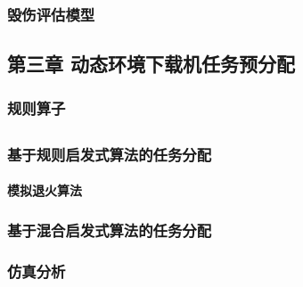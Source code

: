 \hypertarget{ux6bc1ux4f24ux8bc4ux4f30ux6a21ux578b}{%
\subsubsection{毁伤评估模型}\label{ux6bc1ux4f24ux8bc4ux4f30ux6a21ux578b}}

\hypertarget{ux7b2cux4e09ux7ae0-ux52a8ux6001ux73afux5883ux4e0bux8f7dux673aux4efbux52a1ux9884ux5206ux914d}{%
\subsection{第三章
动态环境下载机任务预分配}\label{ux7b2cux4e09ux7ae0-ux52a8ux6001ux73afux5883ux4e0bux8f7dux673aux4efbux52a1ux9884ux5206ux914d}}

\hypertarget{ux89c4ux5219ux7b97ux5b50}{%
\subsubsection{规则算子}\label{ux89c4ux5219ux7b97ux5b50}}

\hypertarget{section}{%
\subsection{}\label{section}}

\hypertarget{ux57faux4e8eux89c4ux5219ux542fux53d1ux5f0fux7b97ux6cd5ux7684ux4efbux52a1ux5206ux914d}{%
\subsubsection{基于规则启发式算法的任务分配}\label{ux57faux4e8eux89c4ux5219ux542fux53d1ux5f0fux7b97ux6cd5ux7684ux4efbux52a1ux5206ux914d}}

\hypertarget{ux6a21ux62dfux9000ux706bux7b97ux6cd5}{%
\paragraph{模拟退火算法}\label{ux6a21ux62dfux9000ux706bux7b97ux6cd5}}

\hypertarget{ux57faux4e8eux6df7ux5408ux542fux53d1ux5f0fux7b97ux6cd5ux7684ux4efbux52a1ux5206ux914d}{%
\subsubsection{基于混合启发式算法的任务分配}\label{ux57faux4e8eux6df7ux5408ux542fux53d1ux5f0fux7b97ux6cd5ux7684ux4efbux52a1ux5206ux914d}}

\hypertarget{ux4effux771fux5206ux6790}{%
\subsubsection{仿真分析}\label{ux4effux771fux5206ux6790}}

